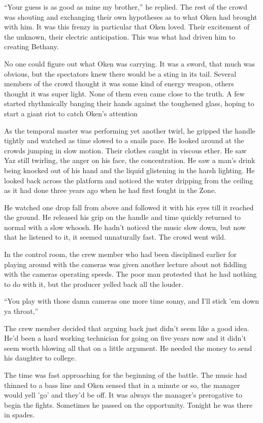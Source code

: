 ``Your guess is as good as mine my brother,'' he replied. The rest of the crowd was shouting and exchanging their own hypotheses as to what Oken had brought with him. It was this frenzy in particular that Oken loved. Their excitement of the unknown, their electric anticipation. This was what had driven him to creating Bethany.

No one could figure out what Oken was carrying. It was a sword, that much was obvious, but the spectators knew there would be a sting in its tail. Several members of the crowd thought it was some kind of energy weapon, others thought it was super light. None of them even came close to the truth. A few started rhythmically banging their hands against the toughened glass, hoping to start a giant riot to catch Oken's attention

As the temporal master was performing yet another twirl, he gripped the handle tightly and watched as time slowed to a snails pace. He looked around at the crowds jumping in slow motion. Their clothes caught in viscous ether. He saw Yaz still twirling, the anger on his face, the concentration. He saw a man's drink being knocked out of his hand and the liquid glistening in the harsh lighting. He looked back across the platform and noticed the water dripping from the ceiling as it had done three years ago when he had first fought in the Zone.

He watched one drop fall from above and followed it with his eyes till it reached the ground. He released his grip on the handle and time quickly returned to normal with a slow whoosh. He hadn't noticed the music slow down, but now that he listened to it, it seemed unnaturally fast. The crowd went wild.

In the control room, the crew member who had been disciplined earlier for playing around with the cameras was given another lecture about not fiddling with the cameras operating speeds. The poor man protested that he had nothing to do with it, but the producer yelled back all the louder.

``You play with those damn cameras one more time sonny, and I'll stick 'em down ya throat,''

The crew member decided that arguing back just didn't seem like a good idea. He'd been a hard working technician for going on five years now and it didn't seem worth blowing all that on a little argument. He needed the money to send his daughter to college.

The time was fast approaching for the beginning of the battle. The music had thinned to a bass line and Oken sensed that in a minute or so, the manager would yell 'go' and they'd be off. It was always the manager's prerogative to begin the fights. Sometimes he passed on the opportunity. Tonight he was there in spades.

